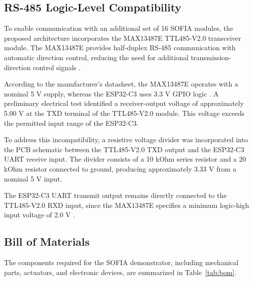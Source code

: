 \documentclass[lettersize,journal]{IEEEtran}
\begin{document}
	
	\subsection{RS-485 Logic-Level Compatibility}\label{sec:rs485_logic}
	
	To enable communication with an additional set of 16 SOFIA
	modules, the proposed architecture incorporates the
	MAX13487E TTL485-V2.0 transceiver module. The MAX13487E
	provides half-duplex RS-485 communication with automatic
	direction control, reducing the need for additional
	transmission-direction control signals \cite{max13487e}.
	
	According to the manufacturer's datasheet, the MAX13487E
	operates with a nominal 5 V supply, whereas the ESP32-C3
	uses 3.3 V GPIO logic \cite{max13487e,esp32c3}.
	A preliminary electrical test identified a receiver-output
	voltage of approximately 5.00 V at the TXD terminal of
	the TTL485-V2.0 module. This voltage exceeds the
	permitted input range of the ESP32-C3.
	
	To address this incompatibility, a resistive voltage
	divider was incorporated into the PCB schematic between
	the TTL485-V2.0 TXD output and the ESP32-C3 UART receive
	input. The divider consists of a 10 kOhm series resistor
	and a 20 kOhm resistor connected to ground, producing
	approximately 3.33 V from a nominal 5 V input.
	
	The ESP32-C3 UART transmit output remains directly
	connected to the TTL485-V2.0 RXD input, since the
	MAX13487E specifies a minimum logic-high input voltage
	of 2.0 V \cite{max13487e}.
	
	
	\subsection{Bill of Materials}
	The components required for the SOFIA demonstrator,
	including mechanical parts, actuators, and electronic
	devices, are summarized in Table~\ref{tab:bom}.
	
	
	
\end{document}
